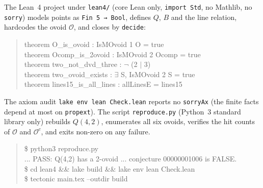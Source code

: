 \documentclass[11pt]{article}
\theoremstyle{definition}
\theoremstyle{remark}
\newcommand{\ov}{\mathcal{O}}
\begin{document}
The Lean~4 project under \texttt{lean4/} (core Lean only, \texttt{import Std},
no Mathlib, no \texttt{sorry}) models points as \texttt{Fin 5 → Bool}, defines
$Q$, $B$ and the line relation, hardcodes the ovoid $\ov$, and closes by
\texttt{decide}:
\begin{quote}\ttfamily
theorem O\_is\_ovoid : IsMOvoid 1 O = true\\
theorem Ocomp\_is\_2ovoid : IsMOvoid 2 Ocomp = true\\
theorem two\_not\_dvd\_three : \(\neg\) (2 \(\mid\) 3)\\
theorem two\_ovoid\_exists : \(\exists\) S, IsMOvoid 2 S = true\\
theorem lines15\_is\_all\_lines : allLinesE = lines15
\end{quote}
The axiom audit \texttt{lake env lean Check.lean} reports no \texttt{sorryAx}
(the finite facts depend at most on \texttt{propext}). The script
\texttt{reproduce.py} (Python~3 standard library only) rebuilds $Q(4,2)$,
enumerates all six ovoids, verifies the hit counts of $\ov$ and $\ov^{c}$, and
exits non-zero on any failure.

\begin{quote}\ttfamily
\$ python3 reproduce.py\\
... PASS: Q(4,2) has a 2-ovoid ... conjecture 00000001006 is FALSE.\\
\$ cd lean4 \&\& lake build \&\& lake env lean Check.lean\\
\$ tectonic main.tex --outdir build
\end{quote}
\end{document}

